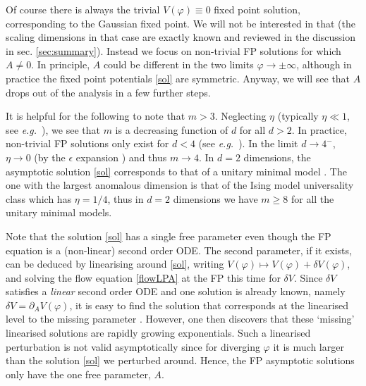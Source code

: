 \documentclass[11pt,a4paper]{article}
\numberwithin{figure}{section}
\numberwithin{equation}{section}
\newcommand\eg{\textit{e.g.}\ }
\newcommand{\ph}{\varphi}
\begin{document}
Of course there is always the trivial $V(\ph)\equiv0$ fixed point solution, corresponding to the Gaussian fixed point. We will not be interested in that  (the scaling dimensions in that case are exactly known and reviewed in the discussion in sec. \ref{sec:summary}). Instead we focus on non-trivial FP solutions for which $A\ne0$. In principle, $A$ could be different in the two limits $\ph\to\pm\infty$, although in practice the fixed point potentials \eqref{sol} are symmetric. Anyway, we will see that $A$ drops out of the analysis in a few further steps.  

It is helpful for the following to note that $m>3$. Neglecting $\eta$ (typically $\eta\ll1$, see \eg \cite{ZinnJustin:2002ru}), we see that $m$ is a decreasing function of $d$ for all $d>2$. In practice, non-trivial FP solutions only exist for $d<4$ (see \eg \cite{Morris:1994ki}). In the limit $d\to4^-$, $\eta\to0$ (by the $\epsilon$ expansion \cite{ZinnJustin:2002ru}) and thus $m\to4$. In $d=2$ dimensions, the asymptotic solution \eqref{sol} corresponds to that of a unitary minimal model \cite{Zamolodchikov:1986db,Morris:1994jc}. The one with the largest anomalous dimension is that of the Ising model universality class which has $\eta=1/4$, thus in $d=2$ dimensions we have $m\ge8$ for all the unitary minimal models.

Note that the solution \eqref{sol} has a single free parameter even though the FP equation is a (non-linear) second order ODE. The second parameter, if it exists, can be deduced by linearising around \eqref{sol}, writing $V(\ph)\mapsto V(\ph)+\delta V(\ph)$, and solving the flow equation \eqref{flowLPA} at the FP this time for $\delta V$. Since $\delta V$ satisfies a \emph{linear} second order ODE and one solution is already known, namely $\delta V = \partial_A V(\ph)$, it is easy to find the solution that corresponds at the linearised level to the missing parameter \cite{Morris:1994ki,Morris:1994ie}.  However, one then discovers that these `missing' linearised solutions are rapidly growing exponentials. Such a linearised perturbation is not valid asymptotically since for diverging $\ph$ it is much larger than the solution \eqref{sol} we perturbed around. Hence, the FP asymptotic solutions only have the one free parameter, $A$. 
\end{document}

